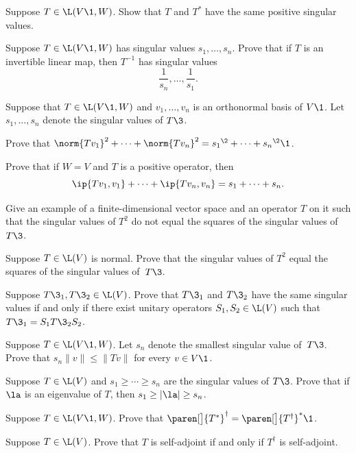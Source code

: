 \exercise
Suppose $T \in \L(V\1, W)$. Show that $T$ and $T^*$ have the same positive singular values. \label{4TstarSing}


\exercise
Suppose $T \in \L(V\1, W)$ has singular values $s_1, \ldots, s_n$. Prove that if $T$ is an  invertible linear map, then $T^{-1}$ has singular values\label{7singinv}
\[
\frac{1}{s_n}, \ldots, \frac{1}{s_1}.
\]
\exercisedisplayend


\exercise
Suppose that $T \in \L(V\1, W)$ and $v_1, \ldots, v_n$ is an orthonormal basis of $V\1$. Let $s_1, \ldots, s_n$ denote the singular values of $T\3$.\label{7sums2}
\begin{subtheorem}
\item
Prove that
$\norm{Tv_1}^2 + \cdots + \norm{Tv_n}^2 = {s_1}^{\2} + \cdots + {s_n}^{\2}\1$.
\item
Prove that if $W = V$ and $T$ is a positive operator, then
\[
\ip{Tv_1, v_1} + \cdots + \ip{Tv_n, v_n} = s_1 + \cdots + s_n.
\]
\exercisedisplayend
\end{subtheorem}


\exercise
\begin{SUBtheorem}
\item
Give an example of a finite-dimensional vector space and an operator $T$ on it
such that the singular values of $T^2$ do not equal the squares of the singular values of~$T\3$.
\item
Suppose $T \in \L(V)$ is normal. Prove that the singular values of $T^2$ equal the squares of the singular values of~$T\3$.
\end{SUBtheorem}


\exercise
Suppose $T\3_1, T\3_2 \in \L(V)$.  Prove that $T\3_1$ and $T\3_2$ have the
same singular values if and only if there exist unitary operators $S_1, S_2
\in \L(V)$ such that $T\3_1 = S_1 T\3_2 S_2$.


\exercise
Suppose $T \in \L(V\1,W)$.  Let $s_n$ denote the smallest singular value of~$T\3$.
Prove that $s_n \| v \| \le \| Tv \|$ for every $v \in V\1$. \label{3smallSV}


\exercise
Suppose $T \in \L(V)$ and $s_1 \ge \cdots \ge s_n$ are the singular values of $T\3$.
Prove that if $\la$ is an eigenvalue of $T$, then $s_1  \ge |\la| \ge s_n$.


\exercise
Suppose $T \in \L(V\1, W)$. Prove that $\paren[\big]{T^*}^\dagger = \paren[\big]{T^\dagger}^*\1$.\label{7Tdagstar}


\exercise
Suppose $T \in \L(V)$. Prove that $T$ is self-adjoint if and only if $T^\dagger$ is self-adjoint.


